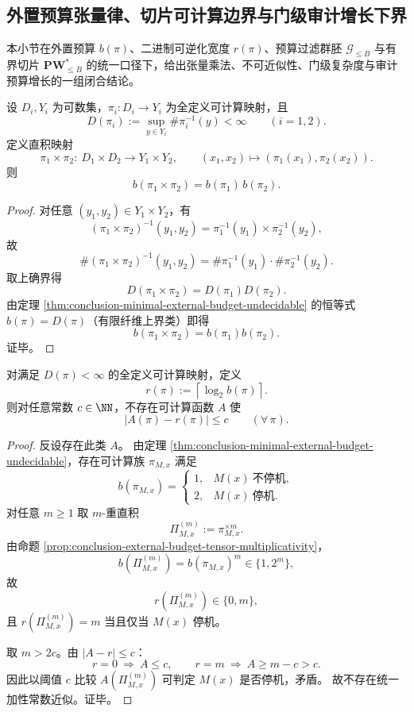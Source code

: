 \subsection{外置预算张量律、切片可计算边界与门级审计增长下界}\label{subsec:conclusion-budget-tensor-slice-obstruction-gate-metric-growth}
本小节在外置预算 \(b(\pi)\)、二进制可逆化宽度 \(r(\pi)\)、预算过滤群胚 \(\mathcal G_{\le B}\) 与有界切片 \(\mathbf{PW}^{\ast}_{\le B}\) 的统一口径下，给出张量乘法、不可近似性、门级复杂度与审计预算增长的一组闭合结论。

\begin{proposition}[外置预算的张量乘法律]\label{prop:conclusion-external-budget-tensor-multiplicativity}
设 \(D_i,Y_i\) 为可数集，\(\pi_i:D_i\to Y_i\) 为全定义可计算映射，且
\[
D(\pi_i):=\sup_{y\in Y_i}\#\pi_i^{-1}(y)<\infty\qquad(i=1,2).
\]
定义直积映射
\[
\pi_1\times\pi_2:\ D_1\times D_2\to Y_1\times Y_2,\qquad
(x_1,x_2)\mapsto(\pi_1(x_1),\pi_2(x_2)).
\]
则
\[
b(\pi_1\times\pi_2)=b(\pi_1)\,b(\pi_2).
\]
\end{proposition}
\begin{proof}
对任意 \((y_1,y_2)\in Y_1\times Y_2\)，有
\[
(\pi_1\times\pi_2)^{-1}(y_1,y_2)
=\pi_1^{-1}(y_1)\times\pi_2^{-1}(y_2),
\]
故
\[
\#(\pi_1\times\pi_2)^{-1}(y_1,y_2)
=\#\pi_1^{-1}(y_1)\cdot\#\pi_2^{-1}(y_2).
\]
取上确界得
\[
D(\pi_1\times\pi_2)=D(\pi_1)D(\pi_2).
\]
由定理 \ref{thm:conclusion-minimal-external-budget-undecidable} 的恒等式 \(b(\pi)=D(\pi)\)（有限纤维上界类）即得
\[
b(\pi_1\times\pi_2)=b(\pi_1)b(\pi_2).
\]
证毕。
\end{proof}

\begin{theorem}[二进制可逆化宽度不存在统一加性常数近似]\label{thm:conclusion-reversible-width-no-uniform-additive-approx}
对满足 \(D(\pi)<\infty\) 的全定义可计算映射，定义
\[
r(\pi):=\left\lceil\log_2 b(\pi)\right\rceil.
\]
则对任意常数 \(c\in\NN\)，不存在可计算函数 \(A\) 使
\[
|A(\pi)-r(\pi)|\le c\qquad(\forall\,\pi).
\]
\end{theorem}
\begin{proof}
反设存在此类 \(A\)。
由定理 \ref{thm:conclusion-minimal-external-budget-undecidable}，存在可计算族 \(\pi_{M,x}\) 满足
\[
b(\pi_{M,x})=
\begin{cases}
1,&M(x)\ \text{不停机},\\
2,&M(x)\ \text{停机}.
\end{cases}
\]
对任意 \(m\ge 1\) 取 \(m\)-重直积
\[
\Pi_{M,x}^{(m)}:=\pi_{M,x}^{\times m}.
\]
由命题 \ref{prop:conclusion-external-budget-tensor-multiplicativity}，
\[
b(\Pi_{M,x}^{(m)})=b(\pi_{M,x})^m\in\{1,2^m\},
\]
故
\[
r(\Pi_{M,x}^{(m)})\in\{0,m\},
\]
且 \(r(\Pi_{M,x}^{(m)})=m\) 当且仅当 \(M(x)\) 停机。

取 \(m>2c\)。由 \(|A-r|\le c\)：
\[
r=0\ \Longrightarrow\ A\le c,\qquad
r=m\ \Longrightarrow\ A\ge m-c>c.
\]
因此以阈值 \(c\) 比较 \(A(\Pi_{M,x}^{(m)})\) 可判定 \(M(x)\) 是否停机，矛盾。
故不存在统一加性常数近似。证毕。
\end{proof}

